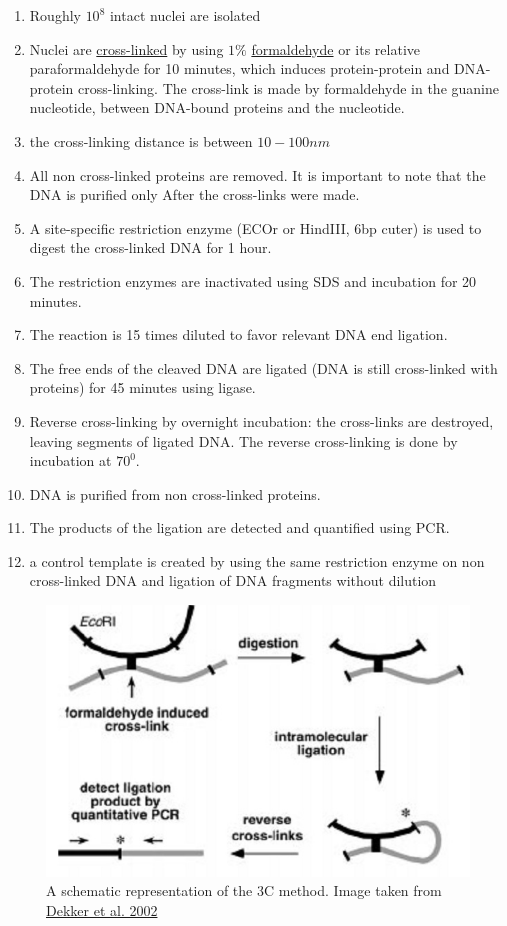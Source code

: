 \documentclass[12pt]{book}
\begin{document}
\begin{enumerate}
\item Roughly $10^8$ intact nuclei are isolated
\item Nuclei are \href{http://en.wikipedia.org/wiki/Crosslinking_of_DNA}{cross-linked} by using $1\%$
\href{http://en.wikipedia.org/wiki/Formaldehyde}{formaldehyde} or its relative paraformaldehyde for 10 minutes, which induces protein-protein and DNA-protein cross-linking. The cross-link is made by formaldehyde in the guanine nucleotide, between DNA-bound proteins and the nucleotide. 
\item the cross-linking distance is between $10-100nm$ \cite{dekker2013exploring}
\item All non cross-linked proteins are removed.  It is important to note that the DNA is purified only After the cross-links were made.
\item A site-specific restriction enzyme (ECOr or HindIII, 6bp cuter) is used to digest the cross-linked DNA for 1 hour. 
\item The restriction enzymes are inactivated using SDS and incubation for 20 minutes.
\item The reaction is 15 times diluted to favor relevant DNA end ligation.
\item The free ends of the cleaved DNA are ligated (DNA is still cross-linked with proteins) for 45 minutes using ligase.
\item Reverse cross-linking by overnight incubation: the cross-links are destroyed, leaving segments of ligated DNA. The reverse cross-linking is done by incubation at $70^0$.
\item DNA is purified from non cross-linked proteins.
\item The products of the ligation are detected and quantified using PCR. 
\item a control template is created by using the same restriction enzyme on non cross-linked DNA and ligation of DNA fragments without dilution
\end{enumerate}

\begin{figure}[H]
\includegraphics[scale = 0.4]{3Cschematic}
\caption{\scriptsize{A schematic representation of the 3C method. Image taken from \href{http://www.sciencemag.org/content/295/5558/1306.full.pdf}{Dekker et al. 2002}\cite{dekker2002capturing}}}
\label{3Cschematic}
\end{figure}
\end{document}
